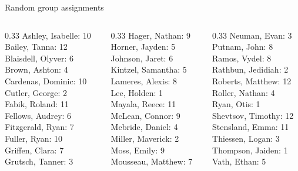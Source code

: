 \documentclass[10pt]{beamer}
\begin{document}
\begin{frame}{Random group assignments}
\begin{columns}
\begin{column}{0.33\textwidth}
Ashley, Isabelle: 10 \\ 
Bailey, Tanna: 12 \\ 
Blaisdell, Olyver: 6 \\ 
Brown, Ashton: 4 \\ 
Cardenas, Dominic: 10 \\ 
Cutler, George: 2 \\ 
Fabik, Roland: 11 \\ 
Fellows, Audrey: 6 \\ 
Fitzgerald, Ryan: 7 \\ 
Fuller, Ryan: 10 \\ 
Griffen, Clara: 7 \\ 
Grutsch, Tanner: 3 \\\end{column}
\begin{column}{0.33\textwidth}
Hager, Nathan: 9 \\ 
Horner, Jayden: 5 \\ 
Johnson, Jaret: 6 \\ 
Kintzel, Samantha: 5 \\ 
Lameres, Alexis: 8 \\ 
Lee, Holden: 1 \\ 
Mayala, Reece: 11 \\ 
McLean, Connor: 9 \\ 
Mcbride, Daniel: 4 \\ 
Miller, Maverick: 2 \\ 
Moss, Emily: 9 \\ 
Mousseau, Matthew: 7 \\\end{column}
\begin{column}{0.33\textwidth}
Neuman, Evan: 3 \\ 
Putnam, John: 8 \\ 
Ramos, Vydel: 8 \\ 
Rathbun, Jedidiah: 2 \\ 
Roberts, Matthew: 12 \\ 
Roller, Nathan: 4 \\ 
Ryan, Otis: 1 \\ 
Shevtsov, Timothy: 12 \\ 
Stensland, Emma: 11 \\ 
Thiessen, Logan: 3 \\ 
Thompson, Jaiden: 1 \\ 
Vath, Ethan: 5 \\\end{column}
\end{columns}
\end{frame}
\end{document}
